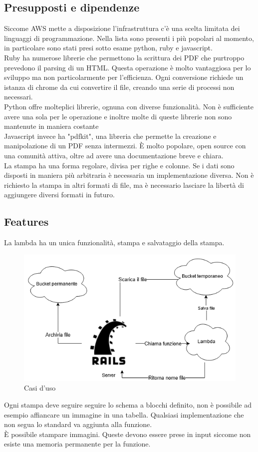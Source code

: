 \documentclass[12pt]{article}
\begin{document}
\subsection{Presupposti e dipendenze}
Siccome AWS mette a disposizione l'infrastruttura c'è una scelta limitata dei 
linguaggi di programmazione.
Nella lista sono presenti i più popolari al momento,
in particolare sono stati presi sotto esame python, ruby e javascript.
\\ Ruby ha numerose librerie che permettono la scrittura dei PDF che purtroppo
prevedono il parsing di un HTML.
Questa operazione è molto vantaggiosa per lo sviluppo ma non particolarmente 
per l'efficienza.
Ogni conversione richiede un istanza di chrome da cui convertire il file,
creando una serie di processi non necessari.  
\\ Python offre molteplici librerie, ognuna con diverse funzionalità. Non è 
sufficiente avere una sola per le operazione e inoltre 
molte di queste librerie non sono mantenute in maniera costante
\\ Javascript invece ha "pdfkit", una libreria che permette la creazione e manipolazione 
di un PDF senza intermezzi. È molto popolare, open source con una comunità 
attiva, oltre ad avere una documentazione breve e chiara.
\\ La stampa ha una forma regolare, divisa per righe e colonne. Se i dati sono 
disposti in maniera più arbitraria è necessaria un implementazione diversa. 
Non è richiesto la stampa in altri formati di file, ma è necessario lasciare 
la libertà di aggiungere diversi formati in futuro.

\subsection{Features}
La lambda ha un unica funzionalità, stampa e salvataggio della stampa.
\begin{figure}[H]
\includegraphics[scale = 0.6]{useCases.png}
\caption{Casi d'uso}
\label{fig:mesh2}
\end{figure}
Ogni stampa deve seguire seguire lo schema a blocchi definito, non è possibile 
ad esempio affiancare un immagine in una tabella. 
Qualsiasi implementazione che non segua lo standard va aggiunta alla funzione.
\\ È possibile stampare immagini. Queste devono essere prese in input siccome non 
esiste una memoria permanente per la funzione.
\end{document}
